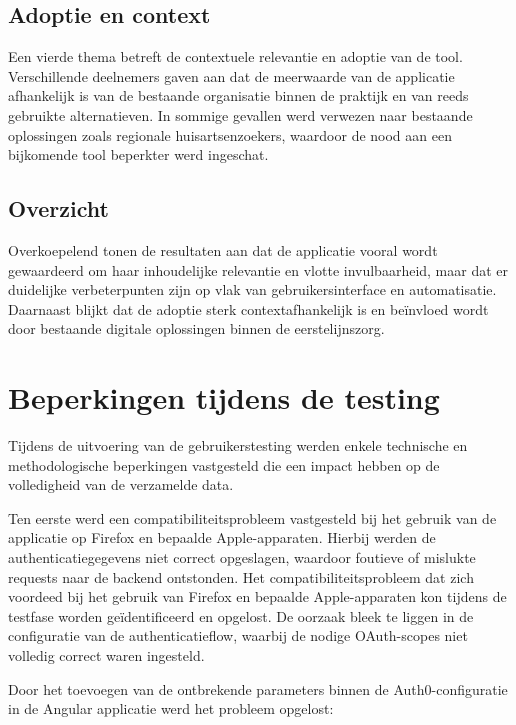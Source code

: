\subsection{Adoptie en context}
\label{subsec:adoptiecontext}

Een vierde thema betreft de contextuele relevantie en adoptie van de tool. 
Verschillende deelnemers gaven aan dat de meerwaarde van de applicatie afhankelijk is van de bestaande organisatie binnen de praktijk en van reeds gebruikte alternatieven. 
In sommige gevallen werd verwezen naar bestaande oplossingen zoals regionale huisartsenzoekers, waardoor de nood aan een bijkomende tool beperkter werd ingeschat.

\subsection{Overzicht}
\label{subsec:overzicht}

Overkoepelend tonen de resultaten aan dat de applicatie vooral wordt gewaardeerd om haar inhoudelijke relevantie en vlotte invulbaarheid, maar dat er duidelijke verbeterpunten zijn op vlak van gebruikersinterface en automatisatie. 
Daarnaast blijkt dat de adoptie sterk contextafhankelijk is en beïnvloed wordt door bestaande digitale oplossingen binnen de eerstelijnszorg.

\section{Beperkingen tijdens de testing}
\label{sec:beperkingen}

Tijdens de uitvoering van de gebruikerstesting werden enkele technische en methodologische beperkingen vastgesteld die een impact hebben op de volledigheid van de verzamelde data.
\medskip

Ten eerste werd een compatibiliteitsprobleem vastgesteld bij het gebruik van de applicatie op Firefox en bepaalde Apple-apparaten. 
Hierbij werden de authenticatiegegevens niet correct opgeslagen, waardoor foutieve of mislukte requests naar de backend ontstonden. 
Het compatibiliteitsprobleem dat zich voordeed bij het gebruik van Firefox en bepaalde Apple-apparaten kon tijdens de testfase worden geïdentificeerd en opgelost. 
De oorzaak bleek te liggen in de configuratie van de authenticatieflow, waarbij de nodige OAuth-scopes niet volledig correct waren ingesteld.
\medskip

Door het toevoegen van de ontbrekende parameters binnen de Auth0-configuratie in de Angular applicatie werd het probleem opgelost:

